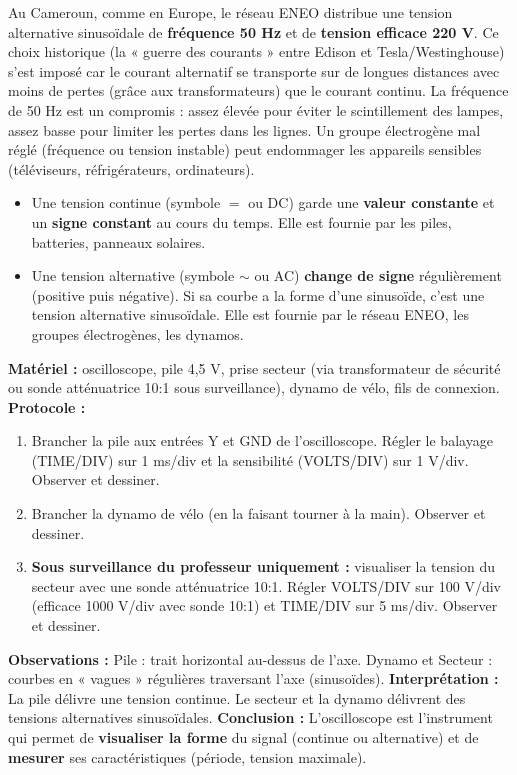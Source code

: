 \documentclass[11pt]{article}
\newcommand{\cle}[1]{{\popxbold\color{popdark}#1}}
\begin{document}
\begin{savaistu}
Au Cameroun, comme en Europe, le réseau ENEO distribue une tension alternative sinusoïdale de \textbf{fréquence 50 Hz} et de \textbf{tension efficace 220 V}. Ce choix historique (la « guerre des courants » entre Edison et Tesla/Westinghouse) s'est imposé car le courant alternatif se transporte sur de longues distances avec moins de pertes (grâce aux transformateurs) que le courant continu. La fréquence de 50 Hz est un compromis : assez élevée pour éviter le scintillement des lampes, assez basse pour limiter les pertes dans les lignes. Un groupe électrogène mal réglé (fréquence ou tension instable) peut endommager les appareils sensibles (téléviseurs, réfrigérateurs, ordinateurs).
\end{savaistu}

\begin{definition}
\begin{itemize}
\item Une \cle{tension continue} (symbole $=$ ou DC) garde une \textbf{valeur constante} et un \textbf{signe constant} au cours du temps. Elle est fournie par les piles, batteries, panneaux solaires.
\item Une \cle{tension alternative} (symbole $\sim$ ou AC) \textbf{change de signe} régulièrement (positive puis négative). Si sa courbe a la forme d'une sinusoïde, c'est une \cle{tension alternative sinusoïdale}. Elle est fournie par le réseau ENEO, les groupes électrogènes, les dynamos.
\end{itemize}
\end{definition}

\begin{experience}
\textbf{Matériel :} oscilloscope, pile 4,5 V, prise secteur (via transformateur de sécurité ou sonde atténuatrice 10:1 sous surveillance), dynamo de vélo, fils de connexion.
\textbf{Protocole :}
\begin{enumerate}
\item Brancher la pile aux entrées Y et GND de l'oscilloscope. Régler le balayage (TIME/DIV) sur 1 ms/div et la sensibilité (VOLTS/DIV) sur 1 V/div. Observer et dessiner.
\item Brancher la dynamo de vélo (en la faisant tourner à la main). Observer et dessiner.
\item \textbf{Sous surveillance du professeur uniquement :} visualiser la tension du secteur avec une sonde atténuatrice 10:1. Régler VOLTS/DIV sur 100 V/div (efficace 1000 V/div avec sonde 10:1) et TIME/DIV sur 5 ms/div. Observer et dessiner.
\end{enumerate}
\textbf{Observations :} Pile : trait horizontal au-dessus de l'axe. Dynamo et Secteur : courbes en « vagues » régulières traversant l'axe (sinusoïdes).
\textbf{Interprétation :} La pile délivre une tension continue. Le secteur et la dynamo délivrent des tensions alternatives sinusoïdales.
\textbf{Conclusion :} L'oscilloscope est l'instrument qui permet de \textbf{visualiser la forme} du signal (continue ou alternative) et de \textbf{mesurer} ses caractéristiques (période, tension maximale).
\end{experience}
\end{document}

